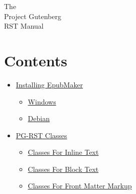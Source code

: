 \documentclass[a5paper]{book}
\begin{document}
\begin{german}
\begin{titlepage_env}
\begin{container}
\vspace*{\fill}

\begin{lineblock}
\begin{center}
{\LARGE\strut{
The \\
\vspace*{1em}
Project Gutenberg \\
\vspace*{1em}
RST Manual \\
}}\end{center}
\end{lineblock}

\vspace*{\fill}

\vspace*{\fill}
\end{container}
\end{titlepage_env}

\begin{contents_env}
\cleardoublepage
\label{id1}%
\hypertarget{id1}{}%
%
\chapter*{
Contents}


\begin{itemize}
\item[] \hyperlink{installing-epubmaker}{Installing EpubMaker}
\begin{itemize}
\item[] \hyperlink{windows}{Windows}

\item[] \hyperlink{debian}{Debian}
\end{itemize}

\item[] \hyperlink{pg-rst-classes}{PG-RST Classes}
\begin{itemize}
\item[] \hyperlink{classes-for-inline-text}{Classes For Inline Text}

\item[] \hyperlink{classes-for-block-text}{Classes For Block Text}

\item[] \hyperlink{classes-for-front-matter-markup}{Classes For Front Matter Markup}
\end{itemize}


\end{itemize}
\end{contents_env}
\end{german}
\end{document}
